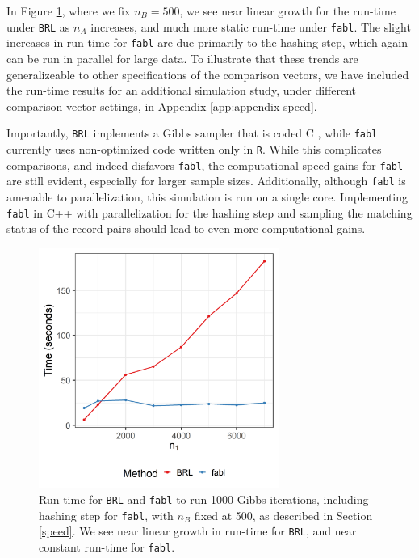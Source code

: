 \documentclass[ba]{imsart}
\begin{document}
	In Figure \ref{fig:speed2}, where we fix $n_B = 500$, we see near linear growth for the run-time under \texttt{BRL} as $n_A$ increases, and much more static run-time under \texttt{fabl}. The slight increases in run-time for \texttt{fabl} are due primarily to the hashing step, which again can be run in parallel for large data. To illustrate that these trends are generalizeable to other specifications of the comparison vectors, we have included the run-time results for an additional simulation study, under different comparison vector settings, in Appendix \ref{app:appendix-speed}.
	
	Importantly, \texttt{BRL} implements a Gibbs sampler that is coded C \citep{sadinle_bayesian_2017}, while \texttt{fabl} currently uses non-optimized code written only in \texttt{R}.  While this complicates comparisons, and indeed disfavors \texttt{fabl}, the computational speed gains for \texttt{fabl} are still evident, especially for larger sample sizes.  Additionally, although \texttt{fabl} is amenable to parallelization, this simulation is run on a single core. Implementing \texttt{fabl} in C++ with parallelization for the hashing step and sampling the matching status of the record pairs should lead to even more computational gains.
	
	\begin{figure}[h!]
		\begin{center} \includegraphics[width=0.7\textwidth]{../notes/figures/speed_plot_fixed_nB_slides} 
			\caption{Run-time for \texttt{BRL} and \texttt{fabl} to run 1000 Gibbs iterations, including hashing step for \texttt{fabl}, with $n_B$ fixed at 500, as described in Section \ref{speed}. We see near linear growth in run-time for \texttt{BRL}, and near constant run-time for \texttt{fabl}.}\label{fig:speed2}
		\end{center}
	\end{figure}
	
\end{document}
